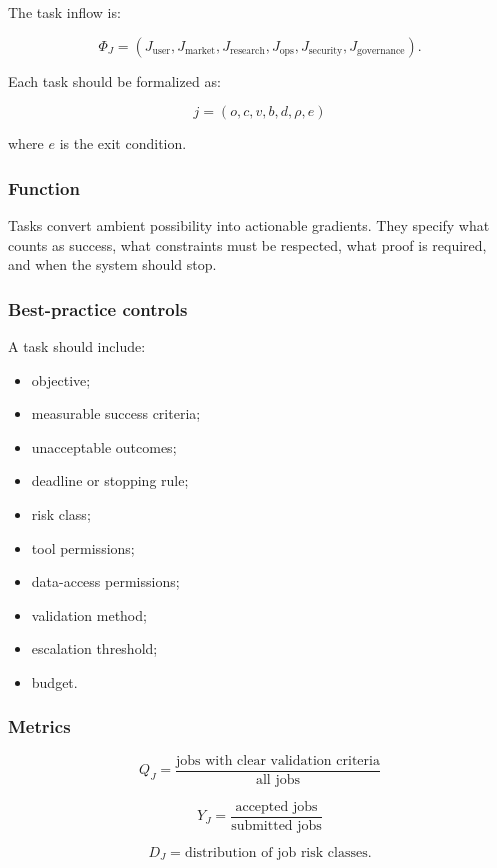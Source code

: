 \documentclass[11pt]{article}
\providecommand{\tightlist}{\setlength{\itemsep}{0pt}\setlength{\parskip}{0pt}}
\begin{document}
The task inflow is:

\[
\Phi_J=(J_{\text{user}},J_{\text{market}},J_{\text{research}},J_{\text{ops}},J_{\text{security}},J_{\text{governance}}).
\]

Each task should be formalized as:

\[
j=(o,c,v,b,d,\rho,e)
\]

where \(e\) is the exit condition.

\subsubsection{Function}\label{function-2}

Tasks convert ambient possibility into actionable gradients. They specify what counts as success, what constraints must be respected, what proof is required, and when the system should stop.

\subsubsection{Best-practice controls}\label{best-practice-controls-2}

A task should include:

\begin{itemize}
\tightlist
\item
  objective;
\item
  measurable success criteria;
\item
  unacceptable outcomes;
\item
  deadline or stopping rule;
\item
  risk class;
\item
  tool permissions;
\item
  data-access permissions;
\item
  validation method;
\item
  escalation threshold;
\item
  budget.
\end{itemize}

\subsubsection{Metrics}\label{metrics-2}

\[
Q_J=\frac{\text{jobs with clear validation criteria}}{\text{all jobs}}
\]

\[
Y_J=\frac{\text{accepted jobs}}{\text{submitted jobs}}
\]

\[
D_J=\text{distribution of job risk classes}.
\]
\end{document}
